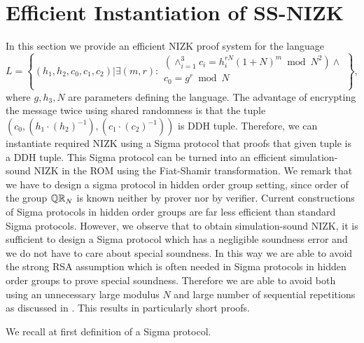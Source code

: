 \section{Efficient Instantiation of SS-NIZK}\label{sec:nizk}
In this section we provide an efficient NIZK proof system for the language 
\[
L = \left\{(h_1, h_2, c_0, c_1, c_2)| \exists (m,r):
\begin{aligned}
       (\land_{i=1}^3 c_i = h_i^{rN}(1+N)^m \bmod N^2) \land \\
       c_0 = g^r \bmod N\\
    \end{aligned}
    \right\}, 
\]
where $g, h_3, N$ are parameters defining the language. The advantage of encrypting the message twice using shared randomness is that the tuple $(c_0, (h_1\cdot (h_2)^{-1}), (c_1\cdot (c_2)^{-1}))$ is DDH tuple. Therefore, we can instantiate required NIZK using a Sigma protocol that proofs that given tuple is a DDH tuple. This Sigma protocol can be turned into an efficient simulation-sound NIZK in the ROM using the Fiat-Shamir transformation. We remark that we have to design a sigma protocol in hidden order group setting, since order of the group $\mathbb{QR}_N$ is known neither by prover nor by verifier. Current constructions of Sigma protocols in hidden order groups are far less efficient than standard Sigma protocols. However, we observe that to obtain simulation-sound NIZK, it is sufficient to design a Sigma protocol which has a negligible soundness error and we do not have to care about special soundness. In this way we are able to avoid the strong RSA assumption which is often needed in Sigma protocols in hidden order groups to prove special soundness. Therefore we are able to avoid both using an unnecessary large modulus $N$ and large number of sequential repetitions as discussed in \cite{SPEED:BKSST}. 
This results in particularly short proofs. 

We recall at first definition of a Sigma protocol. 

